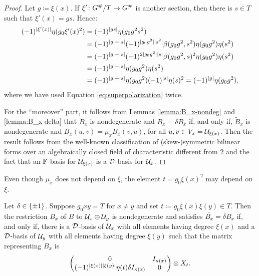 \begin{proof}
	Let $g \coloneqq \xi(x)$. If $\xi' \colon G^\#/T \to G^\#$ is another section, then there is $s \in T$ such that $\xi' (x) = g s$.
	Hence:
	\begin{align*}
		(-1)^{|\xi' (x)|} \eta(g_0 \xi' (x)^2) & = (-1)^{|gs|} \eta(g_0 g^2 s^2)                                                       \\
		                                       & = (-1)^{|g| + |s|} (-1)^{|g_0 g^2||s^2|} \beta(g_0 g^2, s^2)\eta(g_0 g^2) \eta(s^2)     \\
		                                       & = (-1)^{|g| + |s|} (-1)^{2 |g_0 g^2| |s|} \beta(g_0 g^2, s)^2 \eta(g_0 g^2) \eta(s^2) \\
		                                       & = (-1)^{|g| + |s|} \eta(g_0 g^2) \eta(s^2)                                            \\
		                                       & = (-1)^{|g| + |s|} \eta(g_0 g^2) (-1)^{|s|} \eta (s)^2 = (-1)^{|g|} \eta(g_0 g^2),
	\end{align*}
	where we have used Equation \eqref{eq:superpolarization} twice.

	For the ``moreover'' part, it follows from Lemmas \ref{lemma:B_x-nondeg} and \ref{lemma:B_x-delta} that $B_x$ is nondegenerate and $\overline{B_x} = \delta B_x$ if, and only if, $\tilde B_x$ is nondegenerate and $B_x (u,v) = \mu_x B_x(v, u)$, for all $u,v \in V_x = \mathcal U_{\xi(x)}$.
	Then the result follows from the well-known classification of (skew-)symmetric bilinear forms over an algebraically closed field of characteristic different from $2$ and the fact that an $\mathbb{F}$-basis for $\mathcal U_{\xi(x)}$ is a $\mathcal{D}$-basis for $\mathcal U_x$.
\end{proof}

\begin{remark}
	Even though $\mu_{x}$ does not depend on $\xi$, the element $t = g_0\xi(x)^2$ may depend on $\xi$.
\end{remark}

\begin{prop}\label{prop:pair-of-dual-components}
	Let $\delta \in \{ \pm 1 \}$.
	Suppose $g_0 x y = T$ for $x\neq y$ and set $t \coloneqq g_0\xi(x)\xi(y) \in T$.
	Then the restriction $B_x$ of $B$ to $\mathcal U_x \oplus \mathcal U_y$ is nondegenerate and satisfies $\overline{B_x} = \delta B_x$ if, and only if, there is a $\mathcal{D}$-basis of $\mathcal U_x$ with all elements having degree $\xi(x)$ and a $\mathcal{D}$-basis of $\mathcal U_y$ with all elements having degree $\xi(y)$ such that the matrix representing $B_x$ is
	\[
		\begin{pmatrix}
			0                                                  & I_{\kappa(x)} \\
			(-1)^{|\xi(x)||\xi(y)|} \eta(t) \delta I_{\kappa(x)} & 0
		\end{pmatrix} \otimes X_t.
	\]
\end{prop}

